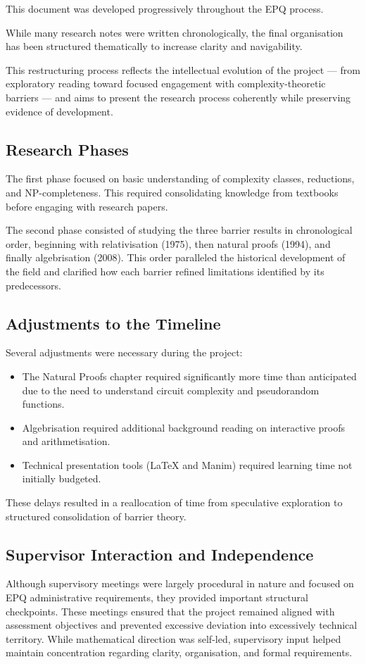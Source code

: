 \documentclass[12pt]{article}
\begin{document}
This document was developed progressively throughout the EPQ process. 

While many research notes were written chronologically, the final organisation has been structured thematically to increase clarity and navigability. 

This restructuring process reflects the intellectual evolution of the project --- from exploratory reading toward focused engagement with complexity-theoretic barriers --- and aims to present the research process coherently while preserving evidence of development.

\subsection{Research Phases}

The first phase focused on basic understanding of complexity classes, reductions, and NP-completeness. This required consolidating knowledge from textbooks before engaging with research papers.

The second phase consisted of studying the three barrier results in chronological order, beginning with relativisation (1975), then natural proofs (1994), and finally algebrisation (2008). This order paralleled the historical development of the field and clarified how each barrier refined limitations identified by its predecessors.

\subsection{Adjustments to the Timeline}

Several adjustments were necessary during the project:

\begin{itemize}
\item The Natural Proofs chapter required significantly more time than anticipated due to the need to understand circuit complexity and pseudorandom functions.
\item Algebrisation required additional background reading on interactive proofs and arithmetisation.
\item Technical presentation tools (LaTeX and Manim) required learning time not initially budgeted.
\end{itemize}

These delays resulted in a reallocation of time from speculative exploration to structured consolidation of barrier theory.

\subsection{Supervisor Interaction and Independence}
Although supervisory meetings were largely procedural in nature and focused on EPQ administrative requirements, they provided important structural checkpoints. These meetings ensured that the project remained aligned with assessment objectives and prevented excessive deviation into excessively technical territory. While mathematical direction was self-led, supervisory input helped maintain concentration regarding clarity, organisation, and formal requirements.
\end{document}
